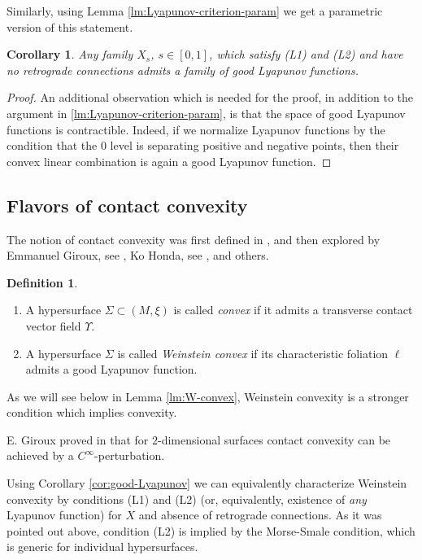 \documentclass[12pt]{amsart}
\theoremstyle{plain}
\newtheorem{corollary}[theorem]{Corollary}
\theoremstyle{definition}
\newtheorem{definition}[theorem]{Definition}
\theoremstyle{remark}
\begin{document}
Similarly,  using Lemma \ref{lm:Lyapunov-criterion-param} we get a parametric version of this statement.
  \begin{corollary}\label{cor:Lyapunov-convexity-param} Any family  $X_s$, $s\in[0,1]$,  which satisfy (L1) and (L2)  and have no retrograde connections admits a family  of  good Lyapunov functions.
\end{corollary}
 \begin{proof} An additional observation which is needed for the proof, in addition  to the argument in \ref{lm:Lyapunov-criterion-param}, is  that the space of good Lyapunov functions is contractible.  Indeed,   if we normalize  Lyapunov functions by the condition that the  $0$ level  is separating positive and negative points, then their convex linear combination   is again a good Lyapunov function.
 \end{proof} 
 
 
\subsection{Flavors of contact convexity}\label{sec:conv}
The notion of contact convexity was first defined in \cite{EG91}, and then explored by Emmanuel Giroux,  see \cite{Gi}, Ko Honda, see \cite{Ho00}, and others.
\begin{definition}
\begin{enumerate}\item  A hypersurface $\Sigma\subset (M,\xi)$ is called {\em convex} if it admits a transverse contact vector field $\Upsilon$.
\item  A hypersurface $\Sigma$ is called {\em Weinstein convex} if
    its characteristic foliation $\ell$ admits a good Lyapunov function.
  \end{enumerate}
  \end{definition}
  As we will see below in Lemma \ref{lm:W-convex}, Weinstein convexity is a stronger condition which  implies   convexity.
  
  
  E. Giroux proved in \cite{Gi} that for  $2$-dimensional surfaces contact convexity can be achieved by a $C^\infty$-perturbation.
    
    Using Corollary \ref{cor:good-Lyapunov} we can equivalently characterize Weinstein convexity by conditions (L1) and (L2)  (or, equivalently, existence of  {\em any} Lyapunov function) for $X$ and absence of retrograde connections.
  As it was pointed out above, condition (L2) is implied by the    Morse-Smale condition, which is generic for individual hypersurfaces.   
 \bigskip
  
\end{document}
